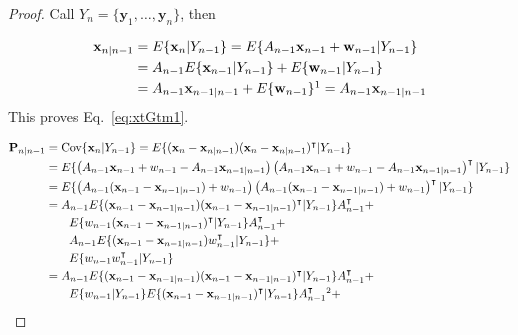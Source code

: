 \begin{proof}
    Call $Y_n=\{\mathbf{y}_1,\ldots,\mathbf{y}_n\}$, then

    \begin{align}
        \mathbf{x}_{n|n-1}&=E\{\mathbf{x}_n|Y_{n-1}\}=E\{A_{n-1}\mathbf{x}_{n-1}+\mathbf{w}_{n-1}|Y_{n-1}\}\nonumber\\
                          &=A_{n-1}E\{\mathbf{x}_{n-1}|Y_{n-1}\}+E\{\mathbf{w}_{n-1}|Y_{n-1}\}\nonumber\\
                          &=A_{n-1}\mathbf{x}_{n-1|n-1}+E\{\mathbf{w}_{n-1}\}\footnotemark[1]=A_{n-1}\mathbf{x}_{n-1|n-1}\nonumber
    \end{align}
	This proves Eq.~\ref{eq:xtGtm1}.

    \begin{align}
        \mathbf{P}_{n|n-1}&=\text{Cov}\{\mathbf{x}_n|Y_{n-1}\}=E\{(\mathbf{x}_n-\mathbf{x}_{n|n-1})(\mathbf{x}_n-\mathbf{x}_{n|n-1})^\intercal|Y_{n-1}\}\nonumber\\
                          &=E\{\left(A_{n-1}\mathbf{x}_{n-1}+w_{n-1}-A_{n-1}\mathbf{x}_{n-1|n-1}\right)\left(A_{n-1}\mathbf{x}_{n-1}+w_{n-1}-A_{n-1}\mathbf{x}_{n-1|n-1}\right)^\intercal|Y_{n-1}\}\nonumber\\
                          &=E\{\left(A_{n-1}(\mathbf{x}_{n-1}-\mathbf{x}_{n-1|n-1})+w_{n-1}\right)\left(A_{n-1}(\mathbf{x}_{n-1}-\mathbf{x}_{n-1|n-1})+w_{n-1}\right)^\intercal|Y_{n-1}\}\nonumber\\
                          &=A_{n-1}E\{(\mathbf{x}_{n-1}-\mathbf{x}_{n-1|n-1})(\mathbf{x}_{n-1}-\mathbf{x}_{n-1|n-1})^\intercal|Y_{n-1}\}A_{n-1}^\intercal+\nonumber\\
                          &\qquad E\{w_{n-1}(\mathbf{x}_{n-1}-\mathbf{x}_{n-1|n-1})^\intercal|Y_{n-1}\}A_{n-1}^\intercal+\nonumber\\
                          &\qquad A_{n-1}E\{(\mathbf{x}_{n-1}-\mathbf{x}_{n-1|n-1})w_{n-1}^\intercal|Y_{n-1}\}+\nonumber\\
                          &\qquad E\{w_{n-1}w_{n-1}^\intercal|Y_{n-1}\}\nonumber\\
                          &=A_{n-1}E\{(\mathbf{x}_{n-1}-\mathbf{x}_{n-1|n-1})(\mathbf{x}_{n-1}-\mathbf{x}_{n-1|n-1})^\intercal|Y_{n-1}\}A_{n-1}^\intercal+\nonumber\\
                          &\qquad E\{w_{n-1}|Y_{n-1}\}E\{(\mathbf{x}_{n-1}-\mathbf{x}_{n-1|n-1})^\intercal|Y_{n-1}\}A_{n-1}^\intercal\footnotemark[2]+\nonumber\\

\end{align}
\end{proof}
